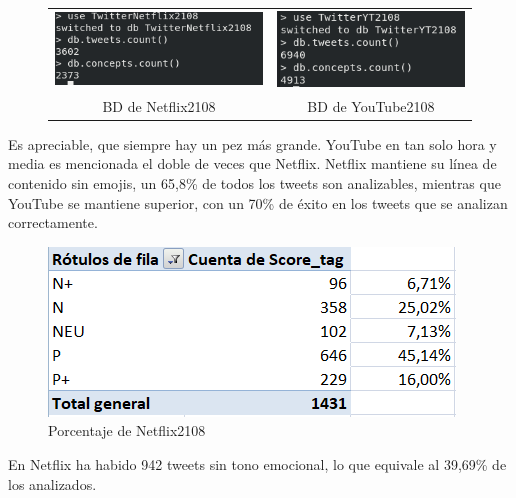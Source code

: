  
 \begin{figure}[H]
 	\centering
 	\begin{tabular}{c c}
 		
 		\includegraphics[scale=.7]{imagenes/Netflix2108Mongo.png}
 		&  \includegraphics[scale=.7]{imagenes/YT2108Mongo.png} \\ 
 		
 		{BD de Netflix2108}
 		
 		&  {BD de YouTube2108} \\ 
 		
 	\end{tabular} 
 	\label{fig:Mongo2108}
 \end{figure}


Es apreciable, que siempre hay un pez más grande. YouTube en tan solo hora y media es mencionada el doble de veces que Netflix.  Netflix mantiene su línea de contenido sin emojis, un 65,8\% de todos los tweets son analizables, mientras que YouTube se mantiene superior, con un 70\% de éxito en los tweets que se analizan correctamente. 



\begin{figure}[H]
	\centering
	\includegraphics[scale=1]{imagenes/porcentajeNetflix2108.PNG}
	\caption{Porcentaje de Netflix2108}
	\label{fig:porcentaje-Netflix2108}
\end{figure}

En Netflix ha habido 942 tweets sin tono emocional, lo que equivale al 39,69\% de los analizados. 

